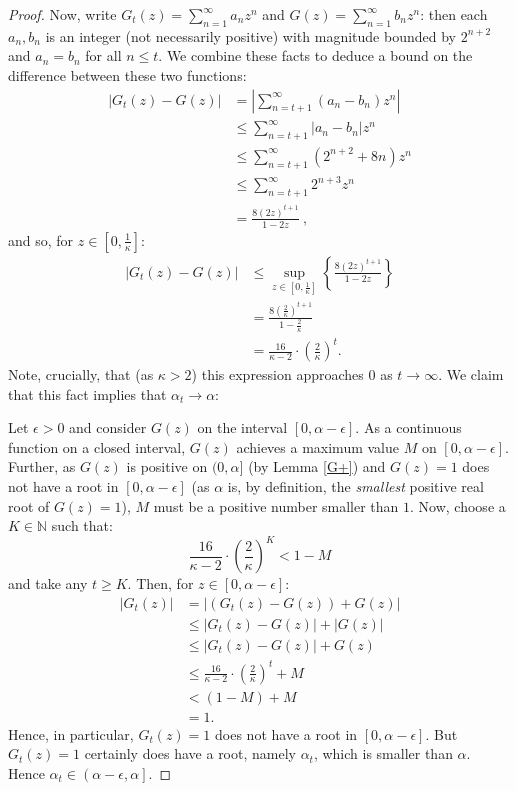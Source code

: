 \documentclass[11pt,a4paper]{article}
\theoremstyle{definition}
\begin{document}
\begin{proof}
Now, write $G_{t}(z) = \sum_{n=1}^{\infty}a_{n}z^n$ and $G(z) = \sum_{n=1}^{\infty}b_{n}z^n$: then each $a_{n}, b_{n}$ is an integer (not necessarily positive) with magnitude bounded by $2^{n+2}$ and $a_{n} = b_{n}$ for all $n \leq t$. We combine these facts to deduce a bound on the difference between these two functions:
\[
\begin{split}
\left|G_{t}(z) - G(z)\right| & = \left|\sum_{n=t+1}^{\infty}(a_{n} - b_{n})z^{n}\right| \\
 & \leq \sum_{n=t+1}^{\infty}\left|a_{n} - b_{n}\right|z^n \\
 & \leq \sum_{n=t+1}^{\infty}(2^{n+2} + 8n)z^{n} \\
 & \leq \sum_{n=t+1}^{\infty}2^{n+3}z^{n} \\
 & = \frac{8(2z)^{t+1}}{1-2z} \ ,
\end{split}
\]
and so, for $z \in \left[0,\frac{1}{\kappa}\right]$:
\[
\begin{split}
\left|G_{t}(z) - G(z)\right| & \leq \sup_{z \in \left[0,\frac{1}{\kappa}\right]}\left\{\frac{8(2z)^{t+1}}{1-2z}\right\} \\
 & = \frac{8(\frac{2}{\kappa})^{t+1}}{1 - \frac{2}{\kappa}} \\
 & = \frac{16}{\kappa - 2} \cdot \left(\frac{2}{\kappa}\right)^{t}.
\end{split}
\]
Note, crucially, that (as $\kappa > 2$) this expression approaches $0$ as $t \rightarrow \infty$. We claim that this fact implies that $\alpha_{t} \rightarrow \alpha$:

Let $\epsilon > 0$ and consider $G(z)$ on the interval $\left[0, \alpha - \epsilon\right]$. As a continuous function on a closed interval, $G(z)$ achieves a maximum value $M$ on $\left[0, \alpha - \epsilon\right]$. Further, as $G(z)$ is positive on $(0,\alpha]$ (by Lemma \ref{G+}) and $G(z)=1$ does not have a root in $\left[0, \alpha - \epsilon\right]$ (as $\alpha$ is, by definition, the \emph{smallest} positive real root of $G(z)=1$), $M$ must be a positive number smaller than $1$. Now, choose a $K \in \mathbb{N}$ such that:
\[
\frac{16}{\kappa - 2} \cdot \left(\frac{2}{\kappa}\right)^{K} < 1 - M
\]
and take any $t \geq K$. Then, for $z \in \left[0, \alpha - \epsilon\right]$:
\[
\begin{split}
\left|G_{t}(z)\right| & = \left|(G_{t}(z) - G(z)) + G(z)\right| \\
 & \leq \left|G_{t}(z) - G(z)\right| + \left|G(z)\right| \\
 & \leq \left|G_{t}(z) - G(z)\right| + G(z) \\
 & \leq \frac{16}{\kappa - 2} \cdot \left(\frac{2}{\kappa}\right)^{t} + M \\
 & < (1 - M) + M \\
 & = 1.
\end{split}
\]
Hence, in particular, $G_{t}(z)=1$ does not have a root in $\left[0, \alpha - \epsilon\right]$. But $G_{t}(z)=1$ certainly does have a root, namely $\alpha_{t}$, which is smaller than $\alpha$. Hence $\alpha_{t} \in \left(\alpha - \epsilon, \alpha\right]$.


\end{proof}
\end{document}
